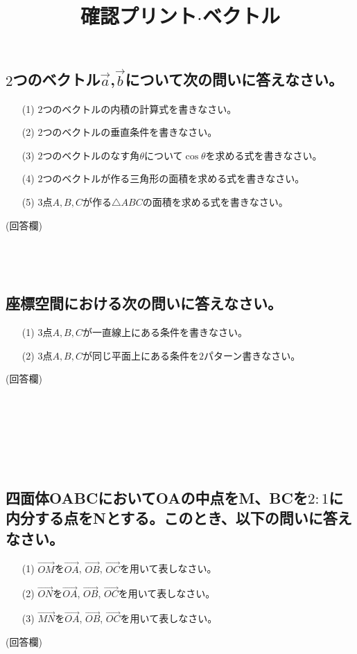 \documentclass[12pt]{jarticle}
\title{確認プリント$\cdot$ベクトル}
\begin{document}
\date{}
\maketitle
\vspace{-3cm}
\subsection*{$2$つのベクトル$\displaystyle \overrightarrow{a}$,$\displaystyle \overrightarrow{b}$について次の問いに答えなさい。}
\begin{itemize}
  \item[(1)] $2$つのベクトルの内積の計算式を書きなさい。
  \item[(2)] $2$つのベクトルの垂直条件を書きなさい。
  \item[(3)] $2$つのベクトルのなす角$\theta$について$\cos{\theta}$を求める式を書きなさい。
  \item[(4)] $2$つのベクトルが作る三角形の面積を求める式を書きなさい。
  \item[(5)] $3$点$A, B, C$が作る$\triangle{ABC}$の面積を求める式を書きなさい。
\end{itemize}
(回答欄)\\
\\
\\
\\
\subsection*{座標空間における次の問いに答えなさい。}
\begin{itemize}
  \item[(1)] $3$点$A, B, C$が一直線上にある条件を書きなさい。
  \item[(2)] $3$点$A, B, C$が同じ平面上にある条件を$2$パターン書きなさい。
\end{itemize}
(回答欄)\\
\\
\\
\\
\\
\\
\\
\subsection*{四面体OABCにおいてOAの中点をM、BCを$2:1$に内分する点をNとする。このとき、以下の問いに答えなさい。}
\begin{itemize}
  \item[(1)] $\displaystyle \overrightarrow{OM}$を$\displaystyle \overrightarrow{OA}$, $\displaystyle \overrightarrow{OB}$, $\displaystyle \overrightarrow{OC}$を用いて表しなさい。
  \item[(2)]  $\displaystyle \overrightarrow{ON}$を$\displaystyle \overrightarrow{OA}$, $\displaystyle \overrightarrow{OB}$, $\displaystyle \overrightarrow{OC}$を用いて表しなさい。
  \item[(3)] $\displaystyle \overrightarrow{MN}$を$\displaystyle \overrightarrow{OA}$, $\displaystyle \overrightarrow{OB}$, $\displaystyle \overrightarrow{OC}$を用いて表しなさい。
\end{itemize}
(回答欄)
\thispagestyle{empty}
\end{document}
